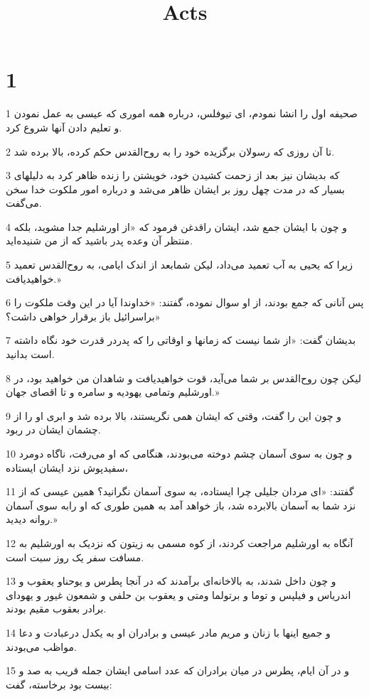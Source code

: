 

\title{Acts}


\chapter{1}

\par 1 صحیفه اول را انشا نمودم، ای تیوفلس، درباره همه اموری که عیسی به عمل نمودن و تعلیم دادن آنها شروع کرد.
\par 2 تا آن روزی که رسولان برگزیده خود را به روح‌القدس حکم کرده، بالا برده شد.
\par 3 که بدیشان نیز بعد از زحمت کشیدن خود، خویشتن را زنده ظاهر کرد به دلیلهای بسیار که در مدت چهل روز بر ایشان ظاهر می‌شد و درباره امور ملکوت خدا سخن می‌گفت.
\par 4 و چون با ایشان جمع شد، ایشان راقدغن فرمود که «از اورشلیم جدا مشوید، بلکه منتظر آن وعده پدر باشید که از من شنیده‌اید.
\par 5 زیرا که یحیی به آب تعمید می‌داد، لیکن شمابعد از اندک ایامی، به روح‌القدس تعمید خواهیدیافت.»
\par 6 پس آنانی که جمع بودند، از او سوال نموده، گفتند: «خداوندا آیا در این وقت ملکوت را براسرائیل باز برقرار خواهی داشت؟»
\par 7 بدیشان گفت: «از شما نیست که زمانها و اوقاتی را که پدردر قدرت خود نگاه داشته است بدانید.
\par 8 لیکن چون روح‌القدس بر شما می‌آید، قوت خواهیدیافت و شاهدان من خواهید بود، در اورشلیم وتمامی یهودیه و سامره و تا اقصای جهان.»
\par 9 و چون این را گفت، وقتی که ایشان همی نگریستند، بالا برده شد و ابری او را از چشمان ایشان در ربود.
\par 10 و چون به سوی آسمان چشم دوخته می‌بودند، هنگامی که او می‌رفت، ناگاه دومرد سفیدپوش نزد ایشان ایستاده،
\par 11 گفتند: «ای مردان جلیلی چرا ایستاده، به سوی آسمان نگرانید؟ همین عیسی که از نزد شما به آسمان بالابرده شد، باز خواهد آمد به همین طوری که او رابه سوی آسمان روانه دیدید.»
\par 12 آنگاه به اورشلیم مراجعت کردند، از کوه مسمی به زیتون که نزدیک به اورشلیم به مسافت سفر یک روز سبت است.
\par 13 و چون داخل شدند، به بالاخانه‌ای برآمدند که در آنجا پطرس و یوحناو یعقوب و اندریاس و فیلپس و توما و برتولما ومتی و یعقوب بن حلفی و شمعون غیور و یهودای برادر بعقوب مقیم بودند.
\par 14 و جمیع اینها با زنان و مریم مادر عیسی و برادران او به یکدل درعبادت و دعا مواظب می‌بودند.
\par 15 و در آن ایام، پطرس در میان برادران که عدد اسامی ایشان جمله قریب به صد و بیست بود برخاسته، گفت:
